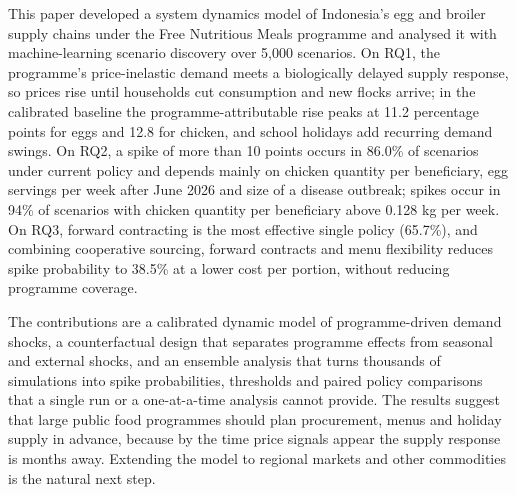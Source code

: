 \documentclass[10pt,twocolumn,a4paper]{article}
\begin{document}
This paper developed a system dynamics model of Indonesia's egg and broiler supply chains under the Free Nutritious Meals programme and analysed it with machine-learning scenario discovery over 5,000 scenarios. On RQ1, the programme's price-inelastic demand meets a biologically delayed supply response, so prices rise until households cut consumption and new flocks arrive; in the calibrated baseline the programme-attributable rise peaks at 11.2 percentage points for eggs and 12.8 for chicken, and school holidays add recurring demand swings. On RQ2, a spike of more than 10 points occurs in 86.0\% of scenarios under current policy and depends mainly on chicken quantity per beneficiary, egg servings per week after June 2026 and size of a disease outbreak; spikes occur in 94\% of scenarios with chicken quantity per beneficiary above 0.128 kg per week. On RQ3, forward contracting is the most effective single policy (65.7\%), and combining cooperative sourcing, forward contracts and menu flexibility reduces spike probability to 38.5\% at a lower cost per portion, without reducing programme coverage.


The contributions are a calibrated dynamic model of programme-driven demand shocks, a counterfactual design that separates programme effects from seasonal and external shocks, and an ensemble analysis that turns thousands of simulations into spike probabilities, thresholds and paired policy comparisons that a single run or a one-at-a-time analysis cannot provide. The results suggest that large public food programmes should plan procurement, menus and holiday supply in advance, because by the time price signals appear the supply response is months away. Extending the model to regional markets and other commodities is the natural next step.


\clearpage
\end{document}
